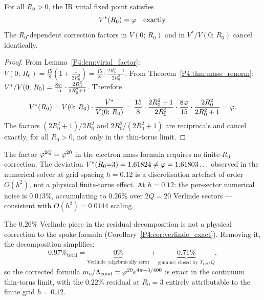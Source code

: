 

\begin{theorem}
\label{P4:thm:verlinde_cancel}
For all $R_0 > 0$, the IR virial fixed point satisfies
\begin{equation}
  V^*(R_0) = \varphi \quad \text{exactly.}
  \label{P4:eq:Vstar_exact}
\end{equation}
The $R_0$-dependent correction factors in $V(0;\,R_0)$
and in $V^*/V(0;\,R_0)$ cancel identically.
\end{theorem}
\begin{proof}
From Lemma~\ref{P4:lem:virial_factor}: $V(0;\,R_0) = \tfrac{15}{8}(1+\tfrac{1}{2R_0^2})
= \tfrac{15}{8}\cdot\tfrac{2R_0^2+1}{2R_0^2}$.
From Theorem~\ref{P4:thm:mass_renorm}: $V^*/V(0;\,R_0) = \tfrac{8\varphi}{15}\cdot\tfrac{2R_0^2}{2R_0^2+1}$.
Therefore
\begin{equation}
  V^*(R_0)
  = V(0;\,R_0)\cdot\frac{V^*}{V(0;\,R_0)}
  = \frac{15}{8}\cdot\frac{2R_0^2+1}{2R_0^2}
    \cdot\frac{8\varphi}{15}\cdot\frac{2R_0^2}{2R_0^2+1}
  = \varphi.
  \label{P4:eq:cancellation_proof}
\end{equation}
The factors $(2R_0^2+1)/2R_0^2$ and $2R_0^2/(2R_0^2+1)$ are reciprocals
and cancel exactly, for all $R_0>0$, not only in the thin-torus limit.
\end{proof}

\begin{corollary}
\label{P4:cor:verlinde_exact}
The factor $\varphi^{2Q} = \varphi^{20}$ in the electron mass formula
requires no finite-$R_0$ correction.
The deviation $V^*(R_0{=}3) = 1.61824 \neq \varphi = 1.61803\ldots$
observed in the numerical solver at grid spacing $h = 0.12$
is a discretisation artefact of order $O(h^2)$, not a physical
finite-torus effect.
At $h=0.12$: the per-sector numerical noise is $0.013\%$,
accumulating to $0.26\%$ over $2Q=20$ Verlinde sectors ---
consistent with $O(h^2) = 0.0144$ scaling.
\end{corollary}

The $0.26\%$ Verlinde piece in the residual decomposition is not a
physical correction to the spoke formula (Corollary~\ref{P4:cor:verlinde_exact}).
Removing it, the decomposition simplifies:
\begin{equation}
  0.97\%_{\text{total}}
  = \underbrace{0\%}_{\text{Verlinde (algebraically zero)}}
  + \underbrace{0.71\%}_{\text{genuine; closed by }T_{1/2}/Q},
  \label{P4:eq:residual_corrected}
\end{equation}
so the corrected formula $m_e/\Lambda_{\mathrm{cond}} = \varphi^{20}e^{4\pi-3/400}$ is exact
in the continuum thin-torus limit, with the $0.22\%$ residual at $R_0=3$
entirely attributable to the finite grid $h=0.12$.

